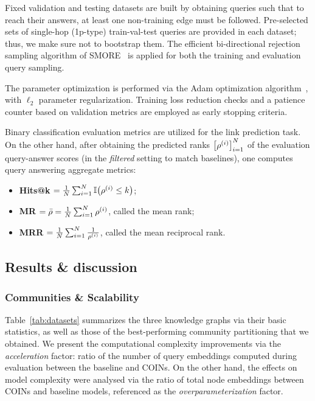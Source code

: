 Fixed validation and testing datasets are built by obtaining queries such that to reach their answers, at least one non-training edge must be followed. Pre-selected sets of single-hop (1p-type) train-val-test queries are provided in each dataset; thus, we make sure not to bootstrap them. The efficient bi-directional rejection sampling algorithm of SMORE~\cite{ren_smore_2021} is applied for both the training and evaluation query sampling. 

The parameter optimization is performed via the Adam optimization algorithm~\cite{kingma_adam_2015}, with $\ell_2$ parameter regularization. Training loss reduction checks and a patience counter based on validation metrics are employed as early stopping criteria.

Binary classification evaluation metrics are utilized for the link prediction task. On the other hand, after obtaining the predicted ranks $\mathopen{}\left[\rho^{\mathopen{}\left(i\right)}\right]_{i=1}^{N}$ of the evaluation query-answer scores (in the \emph{filtered} setting to match baselines), one computes query answering aggregate metrics:
\begin{itemize}
    \item \textbf{Hits@k} $= \frac{1}{N}\sum_{i=1}^{N}{\mathbb{I}\mathopen{}\left(\rho^{\mathopen{}\left(i\right)} \leq k\right)}$;
    \item \textbf{MR} $= \bar{\rho} = \frac{1}{N}\sum_{i=1}^{N}{\rho^{\mathopen{}\left(i\right)}}$, called the mean rank;
    \item \textbf{MRR} $= \frac{1}{N}\sum_{i=1}^{N}{\frac{1}{\rho^{\mathopen{}\left(i\right)}}}$, called the mean reciprocal rank.
\end{itemize}

\subsection{Results \& discussion}
\label{sec:results}

\subsubsection{Communities \& Scalability}

Table~\ref{tab:datasets} summarizes the three knowledge graphs via their basic statistics, as well as those of the best-performing community partitioning that we obtained. We present the computational complexity improvements via the \emph{acceleration} factor: ratio of the number of query embeddings computed during evaluation between the baseline and COINs. On the other hand, the effects on model complexity were analysed via the ratio of total node embeddings between COINs and baseline models, referenced as the \emph{overparameterization} factor. 

